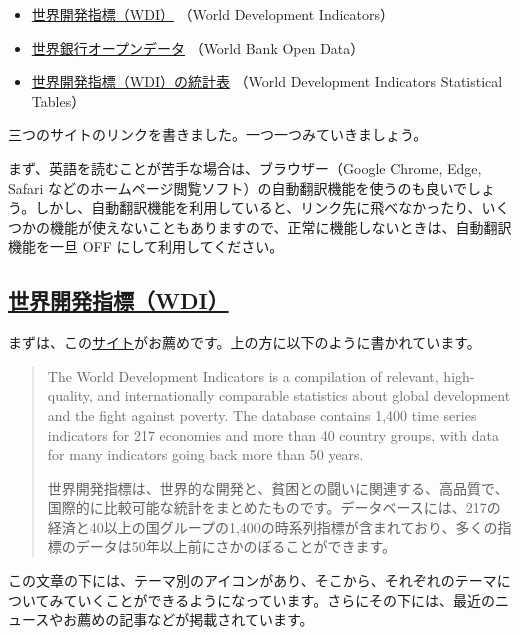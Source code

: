 \documentclass[
  xelatex, ja=standard]{bxjsbook}
\providecommand{\tightlist}{%
  \setlength{\itemsep}{0pt}\setlength{\parskip}{0pt}}
\theoremstyle{definition}
\theoremstyle{definition}
\theoremstyle{definition}
\theoremstyle{definition}
\theoremstyle{remark}
\begin{document}
\begin{itemize}
\tightlist
\item
  \href{https://datatopics.worldbank.org/world-development-indicators/}{世界開発指標（WDI）} （World Development Indicators）
\item
  \href{https://data.worldbank.org}{世界銀行オープンデータ} （World Bank Open Data）
\item
  \href{http://wdi.worldbank.org/tables}{世界開発指標（WDI）の統計表} （World Development Indicators Statistical Tables）
\end{itemize}

三つのサイトのリンクを書きました。一つ一つみていきましょう。

まず、英語を読むことが苦手な場合は、ブラウザー（Google Chrome, Edge, Safari などのホームページ閲覧ソフト）の自動翻訳機能を使うのも良いでしょう。しかし、自動翻訳機能を利用していると、リンク先に飛べなかったり、いくつかの機能が使えないこともありますので、正常に機能しないときは、自動翻訳機能を一旦 OFF にして利用してください。

\hypertarget{ux4e16ux754cux958bux767aux6307ux6a19wdi-1}{%
\subsection{\texorpdfstring{\href{https://datatopics.worldbank.org/world-development-indicators/}{世界開発指標（WDI）}}{世界開発指標（WDI）}}\label{ux4e16ux754cux958bux767aux6307ux6a19wdi-1}}

まずは、この\href{https://datatopics.worldbank.org/world-development-indicators/}{サイト}がお薦めです。上の方に以下のように書かれています。

\begin{quote}
The World Development Indicators is a compilation of relevant, high-quality, and internationally comparable statistics about global development and the fight against poverty. The database contains 1,400 time series indicators for 217 economies and more than 40 country groups, with data for many indicators going back more than 50 years.

世界開発指標は、世界的な開発と、貧困との闘いに関連する、高品質で、国際的に比較可能な統計をまとめたものです。データベースには、217の経済と40以上の国グループの1,400の時系列指標が含まれており、多くの指標のデータは50年以上前にさかのぼることができます。
\end{quote}

この文章の下には、テーマ別のアイコンがあり、そこから、それぞれのテーマについてみていくことができるようになっています。さらにその下には、最近のニュースやお薦めの記事などが掲載されています。
\end{document}
